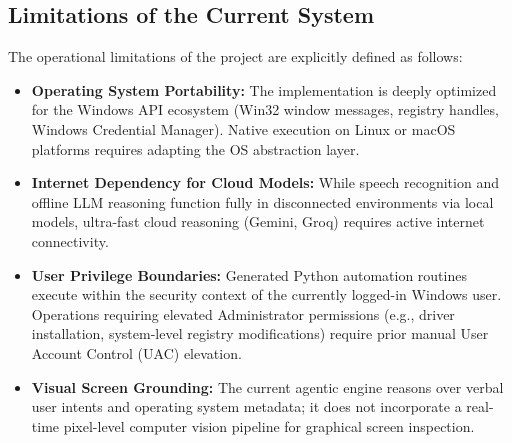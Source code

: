 \subsection{Limitations of the Current System}
The operational limitations of the project are explicitly defined as follows:
\begin{itemize}
    \item \textbf{Operating System Portability:} The implementation is deeply optimized for the Windows API ecosystem (Win32 window messages, registry handles, Windows Credential Manager). Native execution on Linux or macOS platforms requires adapting the OS abstraction layer.
    \item \textbf{Internet Dependency for Cloud Models:} While speech recognition and offline LLM reasoning function fully in disconnected environments via local models, ultra-fast cloud reasoning (Gemini, Groq) requires active internet connectivity.
    \item \textbf{User Privilege Boundaries:} Generated Python automation routines execute within the security context of the currently logged-in Windows user. Operations requiring elevated Administrator permissions (e.g., driver installation, system-level registry modifications) require prior manual User Account Control (UAC) elevation.
    \item \textbf{Visual Screen Grounding:} The current agentic engine reasons over verbal user intents and operating system metadata; it does not incorporate a real-time pixel-level computer vision pipeline for graphical screen inspection.
\end{itemize}

